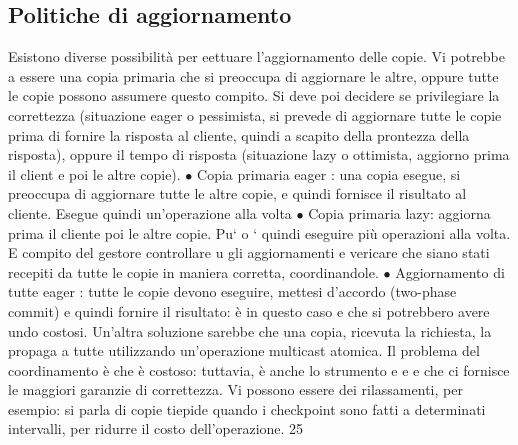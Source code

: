 \subsection{Politiche di aggiornamento}
Esistono diverse possibilità per eettuare l'aggiornamento delle copie. Vi potrebbe
a
essere una copia primaria che si preoccupa di aggiornare le altre, oppure tutte
le copie possono assumere questo compito. Si deve poi decidere se privilegiare
la correttezza (situazione eager o pessimista, si prevede di aggiornare tutte le
copie prima di fornire la risposta al cliente, quindi a scapito della prontezza della risposta), oppure il tempo di
risposta (situazione lazy o ottimista, aggiorno
prima il client e poi le altre copie).
$\bullet$ Copia primaria eager : una copia esegue, si preoccupa di aggiornare tutte
le altre copie, e quindi fornisce il risultato al cliente. Esegue quindi
un'operazione alla volta
$\bullet$ Copia primaria lazy: aggiorna prima il cliente poi le altre copie. Pu`
o
`
quindi eseguire più operazioni alla volta. E compito del gestore controllare
u
gli aggiornamenti e vericare che siano stati recepiti da tutte le copie in
maniera corretta, coordinandole.
$\bullet$ Aggiornamento di tutte eager : tutte le copie devono eseguire, mettesi d'accordo (two-phase commit) e quindi
fornire il risultato: è in questo caso
e
che si potrebbero avere undo costosi. Un'altra soluzione sarebbe che una
copia, ricevuta la richiesta, la propaga a tutte utilizzando un'operazione
multicast atomica.
Il problema del coordinamento è che è costoso: tuttavia, è anche lo strumento
e
e
e
che ci fornisce le maggiori garanzie di correttezza. Vi possono essere dei rilassamenti, per esempio: si parla di copie
tiepide quando i checkpoint sono fatti a
determinati intervalli, per ridurre il costo dell'operazione.
25

